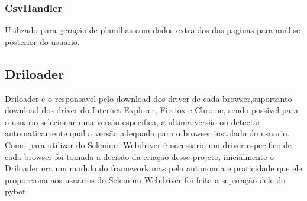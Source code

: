         \subsubsection{CsvHandler}
        Utilizado para geração de planilhas com dados extraidos das paginas para análise posterior do usuario.

    \subsection{Driloader}
    \label{driloader}
        Driloader é o responsavel pelo download dos driver de cada browser,suportanto download dos driver do Internet Explorer,
        Firefox e Chrome, sendo possivel para o usuario selecionar uma versão especifica, a ultima versão ou detectar
        automaticamente qual a versão adequada para o browser instalado do usuario. Como para utilizar do Selenium
        Webdriver é necessario um driver especifico de cada browser foi tomada a decisão da criação desse projeto,
        inicialmente o Driloader era um modulo do framework mas pela autonomia e praticidade que ele proporciona aos
        usuarios do Selenium Webdriver foi feita a separação dele do pybot.



